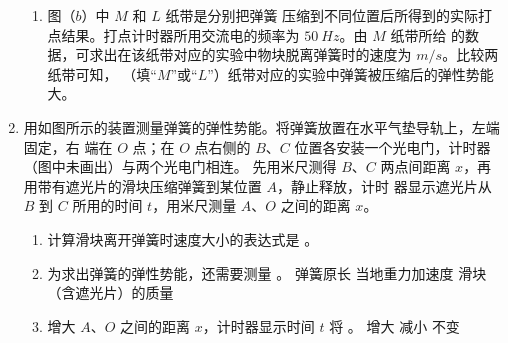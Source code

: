 \begin{enumerate}
\begin{enumerate}
\item 
图（$ b $）中 $ M $ 和 $ L $ 纸带是分别把弹簧
压缩到不同位置后所得到的实际打点结果。打点计时器所用交流电的频率为 $ 50 \ Hz $。由 $ M $ 纸带所给
的数据，可求出在该纸带对应的实验中物块脱离弹簧时的速度为  $ m/s $。比较两纸带可知，
（填“$ M $”或“$ L $”）纸带对应的实验中弹簧被压缩后的弹性势能大。

\begin{figure}[h!]
\centering

\end{figure}

\end{enumerate}





\newpage
\item 
{}
用如图所示的装置测量弹簧的弹性势能。将弹簧放置在水平气垫导轨上，左端固定，右
端在 $ O $ 点；在 $ O $ 点右侧的 $ B $、$ C $ 位置各安装一个光电门，计时器（图中未画出）与两个光电门相连。
先用米尺测得 $ B $、$ C $ 两点间距离 $ x $，再用带有遮光片的滑块压缩弹簧到某位置 $ A $，静止释放，计时
器显示遮光片从 $ B $ 到 $ C $ 所用的时间 $ t $，用米尺测量 $ A $、$ O $ 之间的距离 $ x $。
\begin{figure}[h!]
\centering

\end{figure}

\begin{enumerate}
\renewcommand{\labelenumi}{\arabic{enumi}.}
\item
计算滑块离开弹簧时速度大小的表达式是  。



\item 
为求出弹簧的弹性势能，还需要测量  。
\threechoices
{弹簧原长}
{当地重力加速度}
{滑块（含遮光片）的质量}

\item 
增大 $ A $、$ O $ 之间的距离 $ x $，计时器显示时间 $ t $ 将  。
\threechoices
{增大}
{减小}
{不变}


\end{enumerate}







\end{enumerate}
